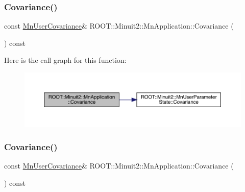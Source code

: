 \mbox{\label{classROOT_1_1Minuit2_1_1MnApplication_abd83494a6b9b808683edc162c28a9888}} 
\subsubsection{\texorpdfstring{Covariance()}{Covariance()}\hspace{0.1cm}{\footnotesize\ttfamily [1/3]}}
{\footnotesize\ttfamily const \mbox{\hyperlink{classROOT_1_1Minuit2_1_1MnUserCovariance}{Mn\+User\+Covariance}}\& R\+O\+O\+T\+::\+Minuit2\+::\+Mn\+Application\+::\+Covariance (\begin{DoxyParamCaption}{ }\end{DoxyParamCaption}) const\hspace{0.3cm}{\ttfamily [inline]}}

Here is the call graph for this function\+:
\nopagebreak
\begin{figure}[H]
\begin{center}
\leavevmode
\includegraphics[width=350pt]{df/dd5/classROOT_1_1Minuit2_1_1MnApplication_abd83494a6b9b808683edc162c28a9888_cgraph}
\end{center}
\end{figure}
\mbox{\label{classROOT_1_1Minuit2_1_1MnApplication_abd83494a6b9b808683edc162c28a9888}} 
\subsubsection{\texorpdfstring{Covariance()}{Covariance()}\hspace{0.1cm}{\footnotesize\ttfamily [2/3]}}
{\footnotesize\ttfamily const \mbox{\hyperlink{classROOT_1_1Minuit2_1_1MnUserCovariance}{Mn\+User\+Covariance}}\& R\+O\+O\+T\+::\+Minuit2\+::\+Mn\+Application\+::\+Covariance (\begin{DoxyParamCaption}{ }\end{DoxyParamCaption}) const\hspace{0.3cm}{\ttfamily [inline]}}

